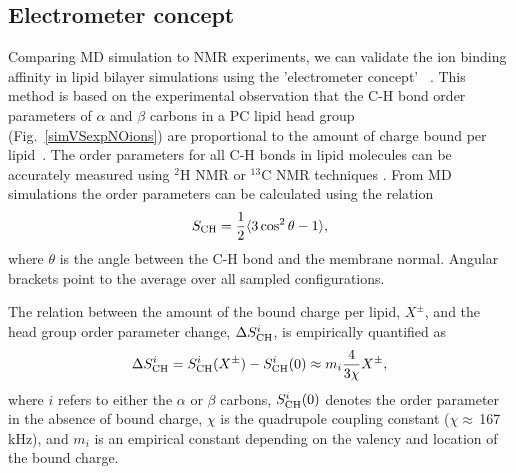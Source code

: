 \documentclass[journal=jpcbfk,manuscript=article]{achemso}
\begin{document}
\subsection{Electrometer concept} \label{section:electrometer}
Comparing MD simulation to NMR experiments, we can validate the ion
binding affinity in lipid bilayer simulations using the 'electrometer concept'~ \cite{seelig87, catte16}.
This method is based on the experimental observation that the C-H bond order parameters of $\alpha$ and $\beta$ carbons in a PC lipid head group (Fig.~\ref{simVSexpNOions}) are proportional to the amount of charge bound per lipid~\cite{seelig87}.
The order parameters for all C-H bonds in lipid molecules can be accurately measured using $^2$H NMR or $^{13}$C NMR techniques \cite{ollila16}. From MD simulations the order parameters can be calculated using the relation
\begin{equation}\label{OP}
S_{\rm CH}=\frac{1}{2}\langle 3\cos^2\theta -1 \rangle,
\end{equation}
where $\theta$ is the angle between the C-H bond and the membrane normal. Angular brackets point to the average over all sampled configurations.

The relation between the amount of the bound charge per lipid, $X^\pm$, and the head group order parameter change, $\Delta S_{\rm{CH}}^{i}$, is empirically quantified as~\cite{seelig87,ferreira16}
\begin{equation}\label{OPchangeEQ}
\Delta S_{\rm{CH}}^{i}= S_{\rm{CH}}^{i}(X^\pm)-S_{\rm{CH}}^{i}(0) \approx m_i \frac{4 }{3\chi}X^\pm,
\end{equation}
where $i$ refers to either the $\alpha$ or $\beta$ carbons, $S_{\rm{CH}}^{i}(0)$ denotes the order parameter in the absence of bound charge, $\chi$ is the quadrupole coupling constant ($\chi \approx$\,167\,kHz), and $m_i$ is an empirical constant depending on the valency and location of the bound charge.
\end{document}
